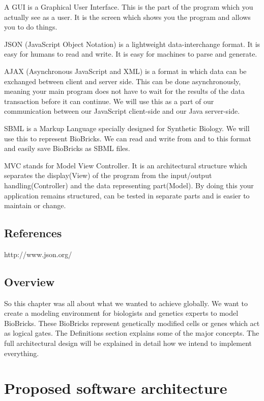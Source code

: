 \documentclass[a4paper]{article}
\begin{document}
A GUI is a Graphical User Interface. This is the part of the program which you actually see as a user. It is the screen which shows you the program and allows you to do things. 

JSON (JavaScript Object Notation) is a lightweight data-interchange format. It is easy for humans to read and write. It is easy for machines to parse and generate.

AJAX (Asynchronous JavaScript and XML) is a format in which data can be exchanged between client and server side. This can be done asynchronously, meaning your main program does not have to wait for the results of the data transaction before it can continue. We will use this as a part of our communication between our JavaScript client-side and our Java server-side.

SBML is a Markup Language specially designed for Synthetic Biology. We will use this to represent BioBricks. We can read and write from and to this format and easily save BioBricks as SBML files.

MVC stands for Model View Controller. It is an architectural structure which separates the display(View) of the program from the input/output handling(Controller) and the data representing part(Model). By doing this your application remains structured, can be tested in separate parts and is easier to maintain or change.
\subsection{References}
http://www.json.org/
\subsection{Overview}
So this chapter was all about what we wanted to achieve globally. We want to create a modeling environment for biologists and genetics experts to model BioBricks. These BioBricks represent genetically modified cells or genes which act as logical gates. The Definitions section explains some of the major concepts. The full architectural design will be explained in detail how we intend to implement everything.

\section{Proposed software architecture}
\end{document}
